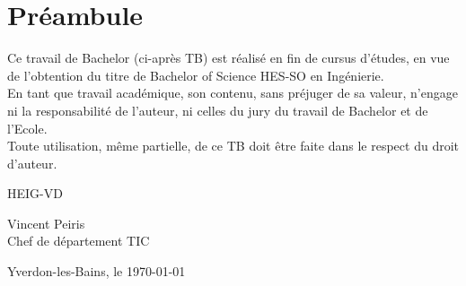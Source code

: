 \hspace{0pt}
\vfill
\section{Préambule}
Ce travail de Bachelor (ci-après TB) est réalisé en fin de cursus d’études, en vue de l'obtention du titre de Bachelor of Science HES-SO en Ingénierie. \\

En tant que travail académique, son contenu, sans préjuger de sa valeur, n'engage ni la responsabilité de l'auteur, ni celles du jury du travail de Bachelor et de l'Ecole. \\

Toute utilisation, même partielle, de ce TB doit être faite dans le respect du droit d’auteur. \\

\begin{flushright}
    \begin{minipage}{7cm}
        \vspace{2cm}
        HEIG-VD \\

        \vspace{2cm}

        Vincent Peiris\\
        Chef de département TIC
    \end{minipage}\hfill
\end{flushright}

\vspace{3cm}

Yverdon-les-Bains, le \today
\vfill
\hspace{0pt}
